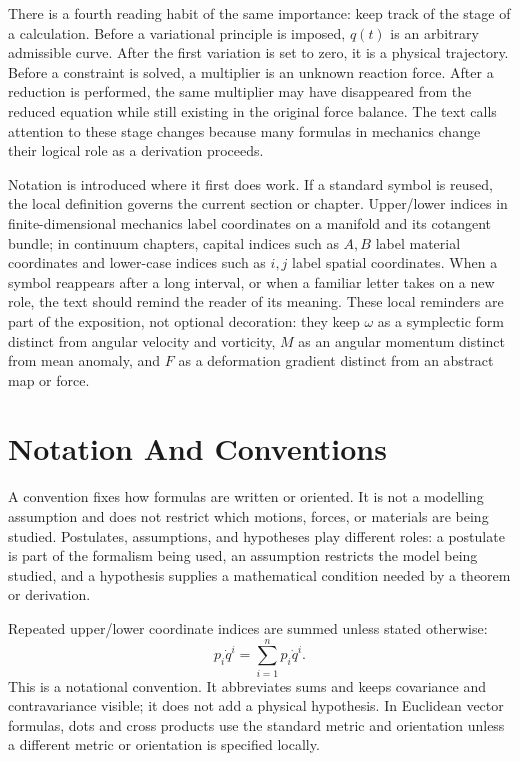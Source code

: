There is a fourth reading habit of the same importance: keep track of the
stage of a calculation. Before a variational principle is imposed, \(q(t)\) is
an arbitrary admissible curve. After the first variation is set to zero, it is
a physical trajectory. Before a constraint is solved, a multiplier is an
unknown reaction force. After a reduction is performed, the same multiplier may
have disappeared from the reduced equation while still existing in the original
force balance. The text calls attention to these stage changes because many
formulas in mechanics change their logical role as a derivation proceeds.

Notation is introduced where it first does work. If a standard symbol is reused,
the local definition governs the current section or chapter. Upper/lower
indices in finite-dimensional mechanics label coordinates on a manifold and its
cotangent bundle; in continuum chapters, capital indices such as \(A,B\) label
material coordinates and lower-case indices such as \(i,j\) label spatial
coordinates.
When a symbol reappears after a long interval, or when a familiar letter takes
on a new role, the text should remind the reader of its meaning.  These local
reminders are part of the exposition, not optional decoration: they keep
\(\omega\) as a symplectic form distinct from angular velocity and vorticity,
\(M\) as an angular momentum distinct from mean anomaly, and \(F\) as a
deformation gradient distinct from an abstract map or force.

\section{Notation And Conventions}
\label{sec:notation-conventions}

A convention fixes how formulas are written or oriented. It is not a modelling
assumption and does not restrict which motions, forces, or materials are being
studied. Postulates, assumptions, and hypotheses play different roles: a
postulate is part of the formalism being used, an assumption restricts the
model being studied, and a hypothesis supplies a mathematical condition needed
by a theorem or derivation.

\begin{convention}
Repeated upper/lower coordinate indices are summed unless stated otherwise:
\[
  p_i\dot q^i=\sum_{i=1}^{n}p_i\dot q^i.
\]
This is a notational convention. It abbreviates sums and keeps covariance and
contravariance visible; it does not add a physical hypothesis. In Euclidean
vector formulas, dots and cross products use the standard metric and
orientation unless a different metric or orientation is specified locally.
\end{convention}

